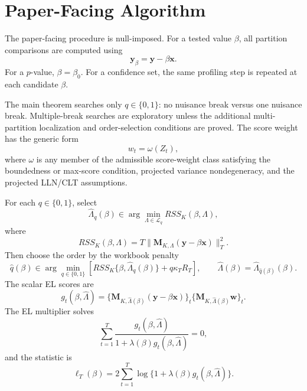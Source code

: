 \documentclass[12pt]{article}
\numberwithin{equation}{section}
\theoremstyle{definition}
\begin{document}
\section{Paper-Facing Algorithm}

The paper-facing procedure is null-imposed. For a tested value \(\beta\), all
partition comparisons are computed using
\[
    \bm y_\beta=\bm y-\beta\bm x.
\]
For a \(p\)-value, \(\beta=\beta_0\). For a confidence set, the same profiling
step is repeated at each candidate \(\beta\).

The main theorem searches only \(q\in\{0,1\}\): no nuisance break versus one
nuisance break. Multiple-break searches are exploratory unless the additional
multi-partition localization and order-selection conditions are proved. The
score weight has the generic form
\[
    w_t=\omega(Z_t),
\]
where \(\omega\) is any member of the admissible score-weight class satisfying
the boundedness or max-score condition, projected variance nondegeneracy, and
the projected LLN/CLT assumptions.

For each \(q\in\{0,1\}\), select
\[
    \widehat\Lambda_q(\beta)
    \in\arg\min_{\Lambda\in\mathcal L_q}
    RSS_K(\beta,\Lambda),
\]
where
\[
    RSS_K(\beta,\Lambda)
    =T\|\bm M_{K,\Lambda}(\bm y-\beta\bm x)\|_T^2.
\]
Then choose the order by the workbook penalty
\[
    \widehat q(\beta)
    \in\arg\min_{q\in\{0,1\}}
    \left[RSS_K\{\beta,\widehat\Lambda_q(\beta)\}
    +q\kappa_T R_T\right],
    \qquad
    \widehat\Lambda(\beta)=\widehat\Lambda_{\widehat q(\beta)}(\beta).
\]
The scalar EL scores are
\[
    g_t(\beta,\widehat\Lambda)
    =\{\bm M_{K,\widehat\Lambda(\beta)}(\bm y-\beta\bm x)\}_t
     \{\bm M_{K,\widehat\Lambda(\beta)}\bm w\}_t.
\]
The EL multiplier solves
\[
    \sum_{t=1}^T
    \frac{g_t(\beta,\widehat\Lambda)}
         {1+\lambda(\beta)g_t(\beta,\widehat\Lambda)}=0,
\]
and the statistic is
\[
    \ell_T(\beta)=2\sum_{t=1}^T
    \log\{1+\lambda(\beta)g_t(\beta,\widehat\Lambda)\}.
\]
\end{document}
